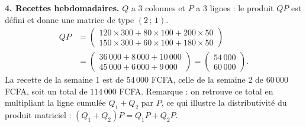 \documentclass[11pt]{article}
\begin{document}
\begin{exoresolu}
\textbf{4. Recettes hebdomadaires.} $Q$ a $3$ colonnes et $P$ a $3$ lignes : le produit $QP$ est défini et donne une matrice de type $(2\,;\,1)$.
\begin{align*}
QP&=\begin{pmatrix} 120\times 300+80\times 100+200\times 50 \\ 150\times 300+60\times 100+180\times 50 \end{pmatrix}\\
&=\begin{pmatrix} 36\,000+8\,000+10\,000 \\ 45\,000+6\,000+9\,000 \end{pmatrix}=\begin{pmatrix} 54\,000 \\ 60\,000 \end{pmatrix}.
\end{align*}
La recette de la semaine 1 est de $54\,000$ FCFA, celle de la semaine 2 de $60\,000$ FCFA, soit un total de $114\,000$ FCFA. Remarque : on retrouve ce total en multipliant la ligne cumulée $Q_1+Q_2$ par $P$, ce qui illustre la distributivité du produit matriciel : $(Q_1+Q_2)P = Q_1P + Q_2P$.


\end{exoresolu}
\end{document}
